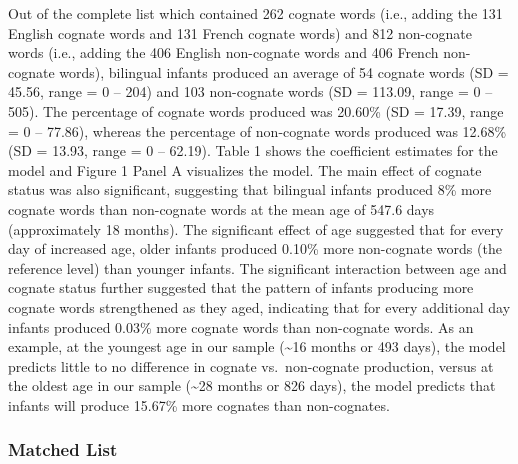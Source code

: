 \documentclass[
  english,
  ,man,floatsintext]{apa6}
\begin{document}
Out of the complete list which contained 262 cognate words (i.e., adding the 131 English cognate words and 131 French cognate words) and 812 non-cognate words (i.e., adding the 406 English non-cognate words and 406 French non-cognate words), bilingual infants produced an average of 54 cognate words (SD = 45.56, range = 0 -- 204) and 103 non-cognate words (SD = 113.09, range = 0 -- 505). The percentage of cognate words produced was 20.60\% (SD = 17.39, range = 0 -- 77.86), whereas the percentage of non-cognate words produced was 12.68\% (SD = 13.93, range = 0 -- 62.19). Table 1 shows the coefficient estimates for the model and Figure 1 Panel A visualizes the model. The main effect of cognate status was also significant, suggesting that bilingual infants produced 8\% more cognate words than non-cognate words at the mean age of 547.6 days (approximately 18 months). The significant effect of age suggested that for every day of increased age, older infants produced 0.10\% more non-cognate words (the reference level) than younger infants. The significant interaction between age and cognate status further suggested that the pattern of infants producing more cognate words strengthened as they aged, indicating that for every additional day infants produced 0.03\% more cognate words than non-cognate words. As an example, at the youngest age in our sample (\textasciitilde16 months or 493 days), the model predicts little to no difference in cognate vs.~non-cognate production, versus at the oldest age in our sample (\textasciitilde28 months or 826 days), the model predicts that infants will produce 15.67\% more cognates than non-cognates.

\hypertarget{matched-list}{%
\subsubsection{Matched List}\label{matched-list}}
\end{document}
